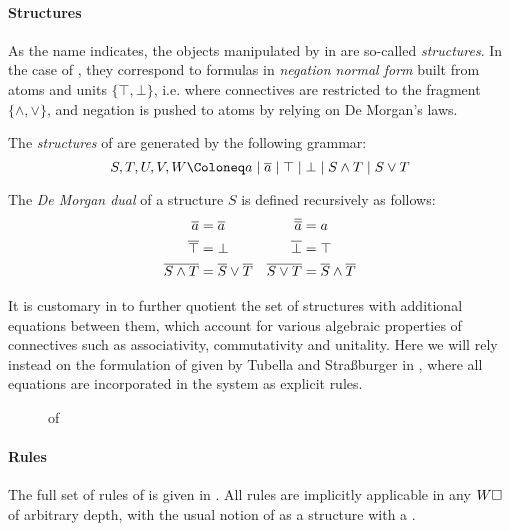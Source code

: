 \begin{scope}
\paragraph{Structures}

As the name indicates, the objects manipulated by  in  are so-called \emph{structures}. In the case of , they
correspond to formulas in \emph{negation normal form} built from atoms and units
$\{\top, \bot\}$, i.e. where connectives are restricted to the fragment
$\{\land, \lor\}$, and negation is pushed to atoms by relying on De Morgan's
laws.

\begin{definition}[Structure]
  The \emph{structures} of  are generated by the following grammar:
  $$S, T, U, V, W \Coloneq a \mid \dmdual{a} \mid \top \mid \bot \mid S \land T
  \mid S \lor T$$
\end{definition}

\begin{definition}
  The \emph{De Morgan dual} of a structure $S$ is defined recursively as
  follows:
  \begin{align*}
    \overline{a} &= \overline{a} & \overline{\overline{a}} &= a \\
    \overline{\top} &= \bot & \overline{\bot} &= \top \\
    \overline{S \land T} &= \overline{S} \lor \overline{T} & \overline{S \lor T} &= \overline{S} \land \overline{T}
  \end{align*}
\end{definition}

It is customary in  to further quotient the set of structures with additional
equations between them, which account for various algebraic properties of
connectives such as associativity, commutativity and unitality. Here we will
rely instead on the formulation of  given by Tubella and Straßburger in
\cite{tubella:hal-02390267}, where all equations are incorporated in the system
as explicit rules.

\begin{figure*}
  
  \caption{ of }
\end{figure*}

\paragraph{Rules}

The full set of rules of  is given in . All rules are
implicitly applicable in any \emph{} $W\square$ of arbitrary depth, with
the usual notion of  as a structure with a .


\end{scope}
